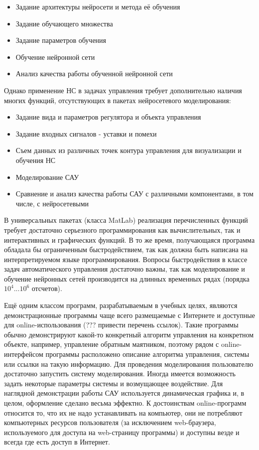 \begin{itemize}
\item Задание архитектуры нейросети и метода её обучения
\item Задание обучающего множества
\item Задание параметров обучения
\item Обучение нейронной сети
\item Анализ качества работы обученной нейронной сети
\end{itemize}

Однако применение НС в задачах управления требует дополнительно
наличия многих функций, отсутствующих в пакетах нейросетевого
моделирования:

\begin{itemize}
\item Задание вида и параметров регулятора и объекта управления
\item Задание входных сигналов - уставки и помехи
\item Съем данных из различных точек контура управления для
  визуализации и обучения НС
\item Моделирование САУ
\item Сравнение и анализ качества работы САУ с различными
  компонентами, в том числе, с нейросетевыми
\end{itemize}

В универсальных пакетах (класса MatLab) реализация перечисленных
функций требует достаточно серьезного программирования как
вычислительных, так и интерактивных и графических функций.  В то же
время, получающаяся программа обладала бы ограниченным
быстродействием, так как должна быть написана на интерпретируемом
языке программирования.  Вопросы быстродействия в классе задач
автоматического управления достаточно важны, так как моделирование и
обучение нейронных сетей производится на длинных временных рядах
(порядка $10^4 ... 10^6$ отсчетов).

Ещё одним классом программ, разрабатываемым в учебных целях, являются
демонстрационные программы чаще всего размещаемые с Интернете и
доступные для online-использования (??? привести перечень ссылок).
Такие программы обычно демонстрируют какой-то конкретный алгоритм
управления на конкретном объекте, например, управление обратным
маятником, поэтому рядом с online-интерфейсом программы расположено
описание алгоритма управления, системы или ссылки на такую информацию.
Для проведения моделирования пользователю достаточно запустить систему
моделирования.  Иногда имеется возможность задать некоторые параметры
системы и возмущающее воздействие.  Для наглядной демонстрации работы
САУ используется динамическая графика и, в целом, оформление сделано
весьма эффектно.  К достоинствам online-программ относится то, что их
не надо устанавливать на компьютер, они не потребляют компьютерных
ресурсов пользователя (за исключением web-браузера, используемого для
доступа на web-страницу программы) и доступны везде и всегда где есть
доступ в Интернет.

